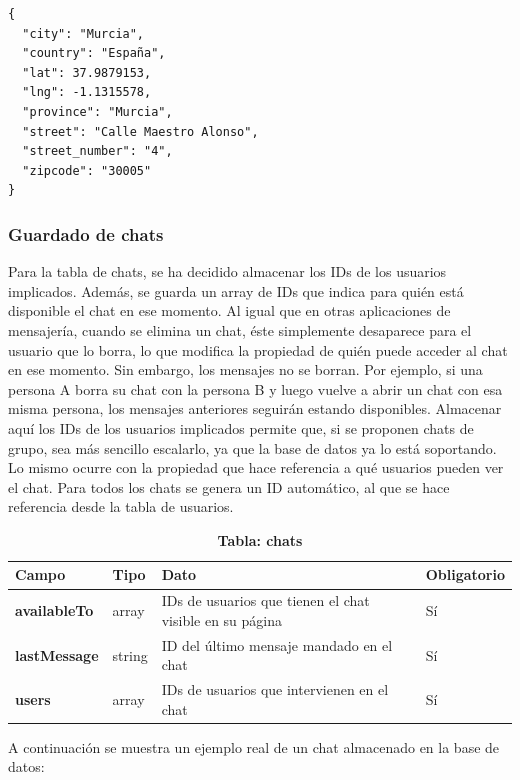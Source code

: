\documentclass[a4paper, 12pt]{article}
\begin{document}
\begin{verbatim}
{
  "city": "Murcia",
  "country": "España",
  "lat": 37.9879153,
  "lng": -1.1315578,
  "province": "Murcia",
  "street": "Calle Maestro Alonso",
  "street_number": "4",
  "zipcode": "30005"
}
\end{verbatim}

\subsubsection{Guardado de chats}

Para la tabla de chats, se ha decidido almacenar los IDs de los usuarios implicados. Además, se guarda un array de IDs que indica para quién está disponible el chat en ese momento. Al igual que en otras aplicaciones de mensajería, cuando se elimina un chat, éste simplemente desaparece para el usuario que lo borra, lo que modifica la propiedad de quién puede acceder al chat en ese momento. Sin embargo, los mensajes no se borran. Por ejemplo, si una persona A borra su chat con la persona B y luego vuelve a abrir un chat con esa misma persona, los mensajes anteriores seguirán estando disponibles. Almacenar aquí los IDs de los usuarios implicados permite que, si se proponen chats de grupo, sea más sencillo escalarlo, ya que la base de datos ya lo está soportando. Lo mismo ocurre con la propiedad que hace referencia a qué usuarios pueden ver el chat. Para todos los chats se genera un ID automático, al que se hace referencia desde la tabla de usuarios.

\begin{table}[H]
\captionsetup{justification=raggedright,singlelinecheck=false}
\captionsetup{labelformat=empty}
\caption{\textbf{Tabla: chats}}
\label{tab:chats}
	\begin{tabular}{|m{3cm}|m{2cm}|m{5cm}|m{3cm}|}
	\hline
	\textbf{Campo} & \textbf{Tipo} & \textbf{Dato} & \textbf{Obligatorio} \\ 
	\hline
	\textbf{availableTo} & array & IDs de usuarios que tienen el chat visible en su página &  Sí \\ 
	\hline
	\textbf{lastMessage} & string & ID del último mensaje mandado en el chat &  Sí \\ 
	\hline
	\textbf{users} &  array & IDs de usuarios que intervienen en el chat &  Sí  \\ 
	\hline
\end{tabular}
\end{table}

A continuación se muestra un ejemplo real de un chat almacenado en la base de datos: 
\end{document}
